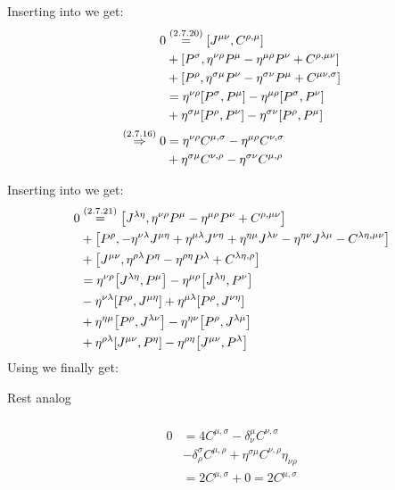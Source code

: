 \subsubsection{ }
Inserting  into  we get:
\begin{align*}
	0&\overset{\eqc{2.7.20}}{=}\commutator{J^{\mu\nu}}{C^{\rho,\mu}}\\
	&+\commutator{P^\sigma}{\eta^{\nu\rho}P^\mu-\eta^{\mu\rho}P^\nu+C^{\rho,\mu\nu}}\\
	&+\commutator{P^\rho}{\eta^{\sigma\mu}P^\nu-\eta^{\sigma\nu}P^\mu+C^{\mu\nu,\sigma}}\\
	&=\eta^{\nu\rho}\commutator{P^\sigma}{P^\mu} - \eta^{\mu\rho} \commutator{P^\sigma}{P^\nu}\\
	&+\eta^{\sigma\mu}\commutator{P^\rho}{P^\nu}-\eta^{\sigma\nu}\commutator{P^\rho}{P^\mu}\\
	\overset{\eqc{2.7.16}}{\Rightarrow} 0&=\eta^{\nu\rho}C^{\mu,\sigma} - \eta^{\mu\rho} C^{\nu,\sigma}\\
	&+\eta^{\sigma\mu}C^{\nu,\rho}-\eta^{\sigma\nu}C^{\mu,\rho}
\end{align*}

Inserting  into  we get:
\begin{align*}
	0&\overset{\eqc{2.7.21}}{=}\commutator{J^{\lambda\eta}}{\eta^{\nu\rho}P^\mu-\eta^{\mu\rho}P^\nu+C^{\rho,\mu\nu}}\\
	&+\commutator{P^\rho}{-\eta^{\nu \lambda}J^{\mu \eta}+\eta^{\mu\lambda}J^{\nu\eta}+\eta^{\eta \mu}J^{\lambda\nu}-\eta^{\eta \nu}J^{\lambda \mu}-C^{\lambda\eta,\mu\nu}}\\
	&+\commutator{J^{\mu\nu}}{\eta^{\rho\lambda}P^\eta-\eta^{\rho\eta}P^\lambda+C^{\lambda\eta,\rho}}\\
	&=\eta^{\nu\rho}\commutator{J^{\lambda\eta}}{P^\mu}-\eta^{\mu\rho}\commutator{J^{\lambda\eta}}{P^\nu}\\
	&-\eta^{\nu \lambda}\commutator{P^\rho}{J^{\mu \eta}}+\eta^{\mu\lambda}\commutator{P^\rho}{J^{\nu\eta}}\\
	&+\eta^{\eta \mu}\commutator{P^\rho}{J^{\lambda\nu}}-\eta^{\eta \nu}\commutator{P^\rho}{J^{\lambda \mu}}\\
	&+\eta^{\rho\lambda}\commutator{J^{\mu\nu}}{P^\eta}-\eta^{\rho\eta}\commutator{J^{\mu\nu}}{P^\lambda}
\end{align*}
Using  we finally get:
\todo


Rest analog \todo


\subsubsection{ }
\begin{align*}
	0&=4C^{\mu,\sigma} - \delta^\mu_\nu C^{\nu,\sigma}\\
	&-\delta^\sigma_\rho C^{\mu,\rho}+\eta^{\sigma\mu}C^{\nu,\rho}\eta_{\nu \rho}\\
	&=2 C^{\mu,\sigma}+0=2 C^{\mu,\sigma}
\end{align*}

